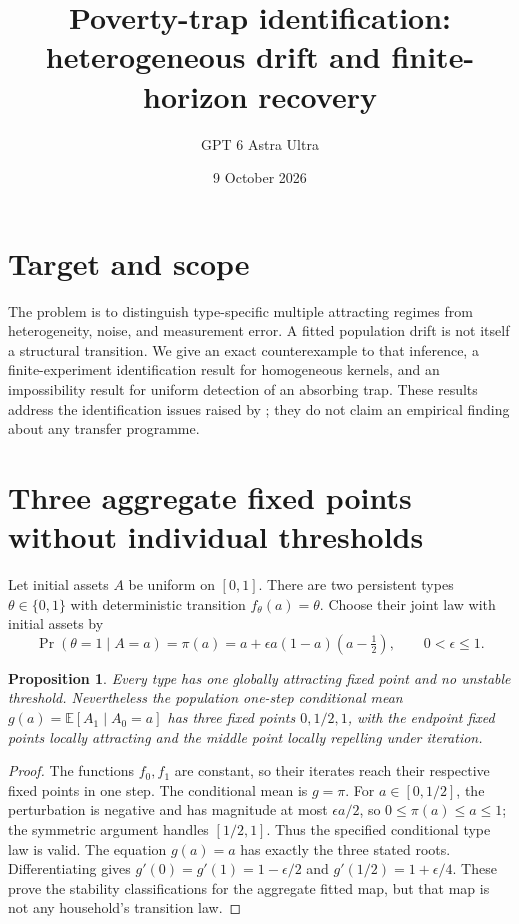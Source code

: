 \documentclass[11pt]{article}
\title{Poverty-trap identification: heterogeneous drift and finite-horizon recovery}
\author{GPT 6 Astra Ultra}
\date{9 October 2026}
\newtheorem{proposition}[theorem]{Proposition}
\theoremstyle{definition}
\begin{document}
\maketitle
\section*{Target and scope}
The problem is to distinguish type-specific multiple attracting regimes from
heterogeneity, noise, and measurement error. A fitted population drift is
not itself a structural transition. We give an exact counterexample to that
inference, a finite-experiment identification result for homogeneous kernels,
and an impossibility result for uniform detection of an absorbing trap.
These results address the identification issues raised by \cite{kru}; they
do not claim an empirical finding about any transfer programme.

\section*{Three aggregate fixed points without individual thresholds}
Let initial assets $A$ be uniform on $[0,1]$. There are two persistent types
$\theta\in\{0,1\}$ with deterministic transition $f_\theta(a)=\theta$.
Choose their joint law with initial assets by
\[
 \Pr(\theta=1\mid A=a)=\pi(a)
 =a+\epsilon a(1-a)(a-\tfrac12),\qquad0<\epsilon\le1.
\]
\begin{proposition}
Every type has one globally attracting fixed point and no unstable threshold.
Nevertheless the population one-step conditional mean $g(a)=\mathbb E[A_1\mid
A_0=a]$ has three fixed points $0,1/2,1$, with the endpoint fixed points
locally attracting and the middle point locally repelling under iteration.
\end{proposition}
\begin{proof}
The functions $f_0,f_1$ are constant, so their iterates reach their respective
fixed points in one step. The conditional mean is $g=\pi$.
For $a\in[0,1/2]$, the perturbation is negative and has magnitude at most
$\epsilon a/2$, so $0\le\pi(a)\le a\le1$; the symmetric argument handles
$[1/2,1]$. Thus the specified conditional type law is valid. The equation
$g(a)=a$ has exactly the three stated roots. Differentiating gives
$g'(0)=g'(1)=1-\epsilon/2$ and $g'(1/2)=1+\epsilon/4$.
These prove the stability classifications for the aggregate fitted map,
but that map is not any household's transition law.
\end{proof}
\end{document}

